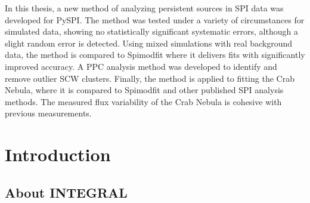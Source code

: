 \documentclass{report}
\begin{document}
\normalsize
In this thesis, a new method of analyzing persistent sources in SPI data was developed for PySPI. The method was tested under a variety of circumstances for simulated data, showing no statistically significant systematic errors, although a slight random error is detected. Using mixed simulations with real background data, the method is compared to Spimodfit where it delivers fits with significantly improved accuracy. A PPC analysis method was developed to identify and remove outlier SCW clusters. Finally, the method is applied to fitting the Crab Nebula, where it is compared to Spimodfit and other published SPI analysis methods. The measured flux variability of the Crab Nebula is cohesive with previous measurements.

\tableofcontents

\pagebreak





\chapter{Introduction}
\label{Introduction}
\section{About INTEGRAL}
\end{document}
